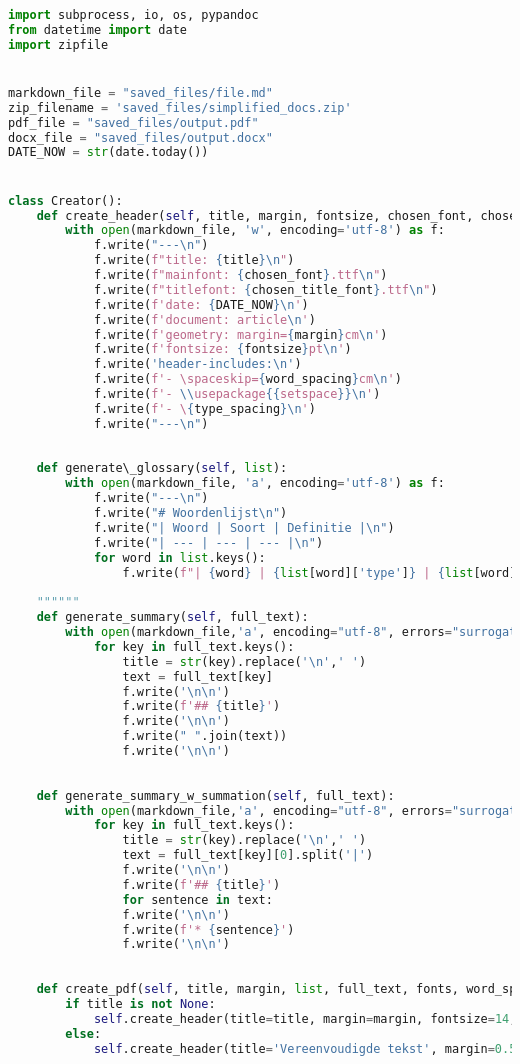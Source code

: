 \medspace

\begin{lstlisting}[language=Python, caption={Writer-klasse omvattende de code om dynamische PDF- en Word-documenten te genereren.}, label={code:writer-klasse}]
import subprocess, io, os, pypandoc
from datetime import date
import zipfile


markdown_file = "saved_files/file.md"
zip_filename = 'saved_files/simplified_docs.zip'
pdf_file = "saved_files/output.pdf"
docx_file = "saved_files/output.docx"
DATE_NOW = str(date.today())


class Creator():
	def create_header(self, title, margin, fontsize, chosen_font, chosen_title_font, word_spacing, type_spacing):
		with open(markdown_file, 'w', encoding='utf-8') as f:
			f.write("---\n")
			f.write(f"title: {title}\n") 
			f.write(f"mainfont: {chosen_font}.ttf\n")
			f.write(f"titlefont: {chosen_title_font}.ttf\n")
			f.write(f'date: {DATE_NOW}\n')
			f.write(f'document: article\n')
			f.write(f'geometry: margin={margin}cm\n')
			f.write(f'fontsize: {fontsize}pt\n')
			f.write('header-includes:\n')
			f.write(f'- \spaceskip={word_spacing}cm\n')
			f.write(f'- \\usepackage{{setspace}}\n')
			f.write(f'- \{type_spacing}\n')
			f.write("---\n")
	
	
	def generate\_glossary(self, list):
		with open(markdown_file, 'a', encoding='utf-8') as f:
			f.write("---\n")
			f.write("# Woordenlijst\n")
			f.write("| Woord | Soort | Definitie |\n")
			f.write("| --- | --- | --- |\n")
			for word in list.keys(): 
				f.write(f"| {word} | {list[word]['type']} | {list[word]['definition']} |\n")
	
	""""""
	def generate_summary(self, full_text):
		with open(markdown_file,'a', encoding="utf-8", errors="surrogateescape") as f:
			for key in full_text.keys():
				title = str(key).replace('\n',' ')
				text = full_text[key]
				f.write('\n\n')
				f.write(f'## {title}')
				f.write('\n\n')
				f.write(" ".join(text))
				f.write('\n\n')
	
	
	def generate_summary_w_summation(self, full_text):
		with open(markdown_file,'a', encoding="utf-8", errors="surrogateescape") as f:
			for key in full_text.keys():
				title = str(key).replace('\n',' ')
				text = full_text[key][0].split('|')
				f.write('\n\n')
				f.write(f'## {title}')
				for sentence in text:    
				f.write('\n\n')
				f.write(f'* {sentence}')
				f.write('\n\n')
	
	
	def create_pdf(self, title, margin, list, full_text, fonts, word_spacing, type_spacing, summation):
		if title is not None:
			self.create_header(title=title, margin=margin, fontsize=14, chosen_font=fonts[0], chosen_title_font=fonts[1], word_spacing=word_spacing, type_spacing=type_spacing)
		else:
			self.create_header(title='Vereenvoudigde tekst', margin=0.5, fontsize=14, chosen_font=fonts[0], chosen_title_font=fonts[1], word_spacing=word_spacing, type_spacing=type_spacing)
	

\end{lstlisting}
